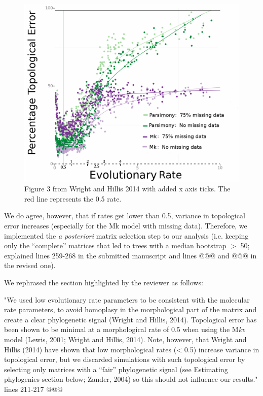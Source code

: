 \documentclass[12pt,letterpaper]{article}
\begin{document}
\begin{enumerate}
\begin{figure}[]
\centering
    \includegraphics[keepaspectratio=true]{response_fig1.pdf}
\caption{Figure 3 from Wright and Hillis 2014 with added x axis ticks. The red line represents the 0.5 rate.}
\end{figure}

We do agree, however, that if rates get lower than 0.5, variance in topological error increases (especially for the Mk model with missing data).
Therefore, we implemented the \textit{a posteriori} matrix selection step to our analysis (i.e. keeping only the ``complete'' matrices that led to trees with a median bootstrap $>$ 50; explained lines 259-268 in the submitted manuscript and lines @@@ and @@@ in the revised one).

We rephrased the section highlighted by the reviewer as follows:

"We used low evolutionary rate parameters to be consistent with the molecular rate parameters, to avoid homoplasy in the morphological part of the matrix and create a clear phylogenetic signal (Wright and Hillis, 2014).
Topological error has been shown to be minimal at a morphological rate of 0.5 when using the M\textit{kv} model (Lewis, 2001; Wright and Hillis, 2014).
Note, however, that Wright and Hillis (2014) have shown that low morphological rates (< 0.5) increase variance in topological error, but we discarded simulations with such topological error by selecting only matrices with a “fair” phylogenetic signal (see Estimating phylogenies section below; Zander, 2004) so this should not influence our results." lines 211-217 @@@


\end{enumerate}
\end{document}
